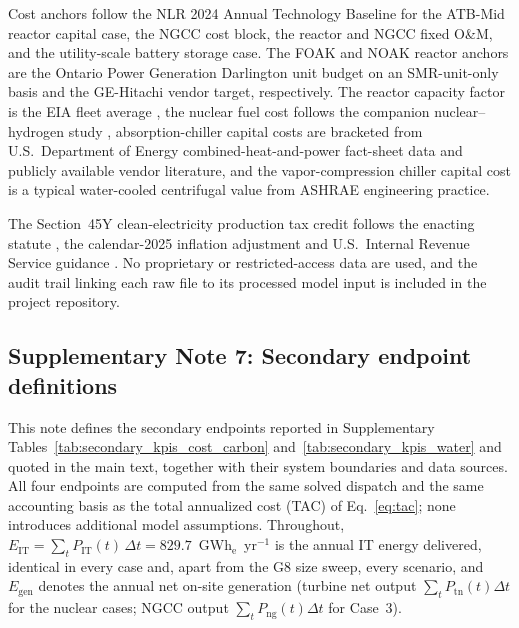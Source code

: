 \documentclass[a4paper,fleqn]{cas-sc}
\begin{document}
Cost anchors follow the NLR 2024 Annual Technology Baseline \citep{atb2024nuclear} for the ATB-Mid reactor capital case, the NGCC cost block, the reactor and NGCC fixed O\&M, and the utility-scale battery storage case. The FOAK and NOAK reactor anchors are the Ontario Power Generation Darlington unit budget on an SMR-unit-only basis and the GE-Hitachi vendor target, respectively. The reactor capacity factor is the EIA fleet average \citep{eia2025capacityfactors}, the nuclear fuel cost follows the companion nuclear--hydrogen study \citep{li2026nuclearH2}, absorption-chiller capital costs are bracketed from U.S.\ Department of Energy combined-heat-and-power fact-sheet data \citep{doe2017chpAbsorption} and publicly available vendor literature, and the vapor-compression chiller capital cost is a typical water-cooled centrifugal value from ASHRAE engineering practice.

The Section~45Y clean-electricity production tax credit follows the enacting statute \citep{usc26_45y,ira2022}, the calendar-2025 inflation adjustment \citep{fr2025_45y} and U.S.\ Internal Revenue Service guidance \citep{irs45y}. No proprietary or restricted-access data are used, and the audit trail linking each raw file to its processed model input is included in the project repository.

\subsection*{Supplementary Note 7: Secondary endpoint definitions}\label{note:endpoints}

This note defines the secondary endpoints reported in Supplementary Tables~\ref{tab:secondary_kpis_cost_carbon} and~\ref{tab:secondary_kpis_water} and quoted in the main text, together with their system boundaries and data sources. All four endpoints are computed from the same solved dispatch and the same accounting basis as the total annualized cost (TAC) of Eq.~\eqref{eq:tac}; none introduces additional model assumptions. Throughout, $E_\mathrm{IT}=\sum_t P_\mathrm{IT}(t)\,\Delta t = 829.7$~GWh$_\mathrm{e}$~yr$^{-1}$ is the annual IT energy delivered, identical in every case and, apart from the G8 size sweep, every scenario, and $E_\mathrm{gen}$ denotes the annual net on-site generation (turbine net output $\sum_t P_\mathrm{tn}(t)\Delta t$ for the nuclear cases; NGCC output $\sum_t P_\mathrm{ng}(t)\Delta t$ for Case~3).
\end{document}
